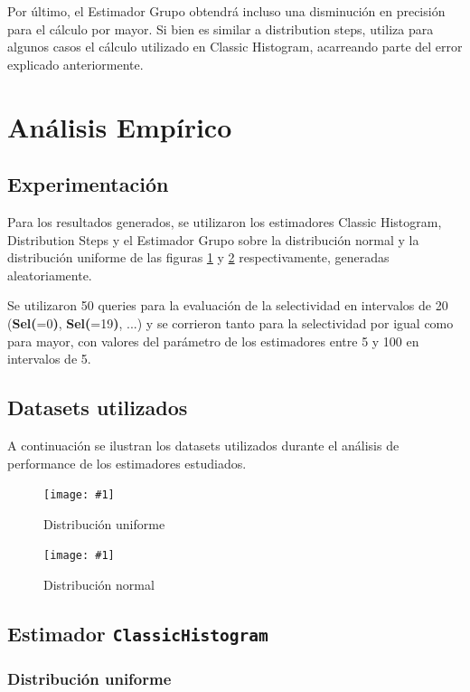 \documentclass[a4paper, 10pt, twoside]{article}
\newcommand{\grafico}[3]{
  \begin{figure}[H]
    \texttt{[image: \#1]}
    \caption{#2}
    \label{#3}
  \end{figure}
}
\begin{document}
Por último, el Estimador Grupo obtendrá incluso una disminución en precisión para el cálculo por mayor. Si bien es similar a distribution steps, utiliza para algunos casos el cálculo utilizado en Classic Histogram, acarreando parte del error explicado anteriormente.



\section{Análisis Empírico}

\subsection{Experimentación}
Para los resultados generados, se utilizaron los estimadores Classic Histogram, Distribution Steps y el Estimador Grupo 
sobre la distribución normal y la distribución uniforme de las figuras \ref{custom-dataset-uniform} y 
\ref{custom-dataset-normal} respectivamente, generadas aleatoriamente. 

Se utilizaron 50 queries para la evaluación de la selectividad en intervalos de 20 (\textbf{Sel(}=0\textbf{)}, \textbf{Sel(}=19\textbf{)}, ...) y se corrieron tanto para la selectividad por igual como para mayor, con valores del parámetro de los estimadores entre 5 y 100 en intervalos de 5.

\subsection{Datasets utilizados}

A continuación se ilustran los datasets utilizados durante el análisis de performance de los estimadores estudiados.

\grafico{custom-dataset-uniform}
        {Distribución uniforme}
        {custom-dataset-uniform}

\grafico{custom-dataset-normal}
        {Distribución normal}
        {custom-dataset-normal}


\subsection{Estimador \texttt{ClassicHistogram}}

\subsubsection{Distribución uniforme}
\end{document}
